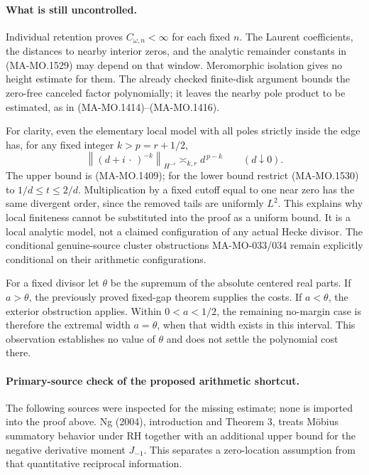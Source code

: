 \paragraph{What is still uncontrolled.}
Individual retention proves $C_{\omega,n}<\infty$ for each
fixed $n$.  The Laurent coefficients, the distances to
nearby interior zeros, and the analytic remainder constants
in (MA-MO.1529) may depend on that window.  Meromorphic
isolation gives no height estimate for them.
The already checked finite-disk argument bounds the
zero-free canceled factor polynomially; it leaves the
nearby pole product to be estimated, as in
(MA-MO.1414)--(MA-MO.1416).

For clarity, even the elementary local model with all poles
strictly inside the edge has, for any fixed integer
$k>p=r+1/2$,
\[
 \left\|(d+i\,\cdot\,)^{-k}\right\|_{H^{-r}}
                   \asymp_{k,r} d^{\,p-k}
                          \qquad(d\downarrow0).
\tag{MA-MO.1533}
\]
The upper bound is (MA-MO.1409); for the lower bound
restrict (MA-MO.1530) to $1/d\le t\le2/d$.
Multiplication by a fixed cutoff equal to one near zero
has the same divergent order, since the removed tails
are uniformly $L^2$.  This explains why local finiteness
cannot be substituted into the proof as a uniform bound.
It is a local analytic model, not a claimed configuration
of any actual Hecke divisor.  The conditional genuine-source
cluster obstructions MA-MO-033/034 remain explicitly
conditional on their arithmetic configurations.

For a fixed divisor let $\theta$ be the supremum of the
absolute centered real parts.  If $a>\theta$, the previously
proved fixed-gap theorem supplies the costs.  If $a<\theta$,
the exterior obstruction applies.  Within $0<a<1/2$, the
remaining no-margin case is therefore the extremal width
$a=\theta$, when that width exists in this interval.
This observation establishes no value of $\theta$ and
does not settle the polynomial cost there.

\paragraph{Primary-source check of the proposed arithmetic shortcut.}
The following sources were inspected for the missing estimate;
none is imported into the proof above.
Ng (2004), introduction and Theorem 3, treats Möbius
summatory behavior under RH together with an additional
upper bound for the negative derivative moment $J_{-1}$.
This separates a zero-location assumption from that
quantitative reciprocal information.


